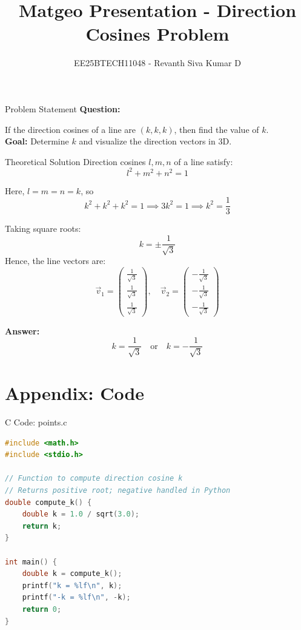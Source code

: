 \documentclass{beamer}
\title{Matgeo Presentation - Direction Cosines Problem}
\author{EE25BTECH11048 - Revanth Siva Kumar D}
\numberwithin{equation}{section}
\providecommand{\brak}[1]{\ensuremath{\left(#1\right)}}
\providecommand{\myvec}[1]{\ensuremath{\begin{pmatrix}#1\end{pmatrix}}}
\begin{document}
\begin{frame}
  \titlepage
\end{frame}

\begin{frame}{Problem Statement}
\textbf{Question:}  

If the direction cosines of a line are $\brak{k,k,k}$, then find the value of $k$.\\

\textbf{Goal:} Determine $k$ and visualize the direction vectors in 3D.
\end{frame}

\begin{frame}{Theoretical Solution}
Direction cosines $l, m, n$ of a line satisfy:
\[
l^2 + m^2 + n^2 = 1
\]

Here, $l = m = n = k$, so
\[
k^2 + k^2 + k^2 = 1 \implies 3k^2 = 1 \implies k^2 = \frac{1}{3}
\]

Taking square roots:
\[
k = \pm \frac{1}{\sqrt{3}}
\]
Hence, the line vectors are:
\[
\vec{v}_1 = \myvec{
\frac{1}{\sqrt{3}}\\[2mm]
\frac{1}{\sqrt{3}}\\[1mm]
\frac{1}{\sqrt{3}}
}, \quad
\vec{v}_2 = \myvec{
-\frac{1}{\sqrt{3}}\\[2mm]
-\frac{1}{\sqrt{3}}\\[1mm]
-\frac{1}{\sqrt{3}}
}
\]

\textbf{Answer:} 
\[
k = \frac{1}{\sqrt{3}} \quad \text{or} \quad k = -\frac{1}{\sqrt{3}}
\]
\end{frame}

\section*{Appendix: Code}

\begin{frame}[fragile]{C Code: points.c}
\begin{lstlisting}[language=C]
#include <math.h>
#include <stdio.h>

// Function to compute direction cosine k
// Returns positive root; negative handled in Python
double compute_k() {
    double k = 1.0 / sqrt(3.0);
    return k;
}

int main() {
    double k = compute_k();
    printf("k = %lf\n", k);
    printf("-k = %lf\n", -k);
    return 0;
}
\end{lstlisting}
\end{frame}
\end{document}
